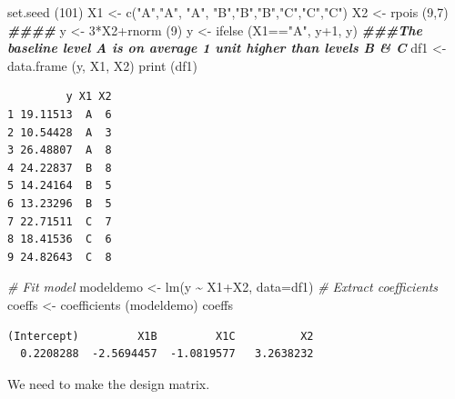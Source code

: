 \documentclass[
  oneside]{krantz}
\newenvironment{Shaded}{\begin{snugshade}}{\end{snugshade}}
\newcommand{\AttributeTok}[1]{\textcolor[rgb]{0.77,0.63,0.00}{#1}}
\newcommand{\CommentTok}[1]{\textcolor[rgb]{0.56,0.35,0.01}{\textit{#1}}}
\newcommand{\DecValTok}[1]{\textcolor[rgb]{0.00,0.00,0.81}{#1}}
\newcommand{\DocumentationTok}[1]{\textcolor[rgb]{0.56,0.35,0.01}{\textbf{\textit{#1}}}}
\newcommand{\FunctionTok}[1]{\textcolor[rgb]{0.00,0.00,0.00}{#1}}
\newcommand{\NormalTok}[1]{#1}
\newcommand{\OtherTok}[1]{\textcolor[rgb]{0.56,0.35,0.01}{#1}}
\newcommand{\SpecialCharTok}[1]{\textcolor[rgb]{0.00,0.00,0.00}{#1}}
\newcommand{\StringTok}[1]{\textcolor[rgb]{0.31,0.60,0.02}{#1}}
\begin{document}
\begin{Shaded}
\begin{Highlighting}[]
\FunctionTok{set.seed}\NormalTok{ (}\DecValTok{101}\NormalTok{)}
\NormalTok{X1 }\OtherTok{\textless{}{-}} \FunctionTok{c}\NormalTok{(}\StringTok{"A"}\NormalTok{,}\StringTok{"A"}\NormalTok{, }\StringTok{"A"}\NormalTok{, }\StringTok{"B"}\NormalTok{,}\StringTok{"B"}\NormalTok{,}\StringTok{"B"}\NormalTok{,}\StringTok{"C"}\NormalTok{,}\StringTok{"C"}\NormalTok{,}\StringTok{"C"}\NormalTok{)}
\NormalTok{X2  }\OtherTok{\textless{}{-}} \FunctionTok{rpois}\NormalTok{ (}\DecValTok{9}\NormalTok{,}\DecValTok{7}\NormalTok{) }\DocumentationTok{\#\#\#\#}
\NormalTok{y }\OtherTok{\textless{}{-}} \DecValTok{3}\SpecialCharTok{*}\NormalTok{X2}\SpecialCharTok{+}\FunctionTok{rnorm}\NormalTok{ (}\DecValTok{9}\NormalTok{)}
\NormalTok{y }\OtherTok{\textless{}{-}} \FunctionTok{ifelse}\NormalTok{ (X1}\SpecialCharTok{==}\StringTok{"A"}\NormalTok{, y}\SpecialCharTok{+}\DecValTok{1}\NormalTok{, y) }\DocumentationTok{\#\#\#The baseline level A is on average 1 unit higher than levels B \& C}
\NormalTok{df1 }\OtherTok{\textless{}{-}} \FunctionTok{data.frame}\NormalTok{ (y, X1, X2)}
\FunctionTok{print}\NormalTok{ (df1)}
\end{Highlighting}
\end{Shaded}

\begin{verbatim}
         y X1 X2
1 19.11513  A  6
2 10.54428  A  3
3 26.48807  A  8
4 24.22837  B  8
5 14.24164  B  5
6 13.23296  B  5
7 22.71511  C  7
8 18.41536  C  6
9 24.82643  C  8
\end{verbatim}

\begin{Shaded}
\begin{Highlighting}[]
\CommentTok{\# Fit model }
\NormalTok{modeldemo }\OtherTok{\textless{}{-}} \FunctionTok{lm}\NormalTok{(y }\SpecialCharTok{\textasciitilde{}}\NormalTok{ X1}\SpecialCharTok{+}\NormalTok{X2, }\AttributeTok{data=}\NormalTok{df1)}
\CommentTok{\# Extract coefficients}
\NormalTok{coeffs }\OtherTok{\textless{}{-}} \FunctionTok{coefficients}\NormalTok{ (modeldemo)}
\NormalTok{coeffs}
\end{Highlighting}
\end{Shaded}

\begin{verbatim}
(Intercept)         X1B         X1C          X2 
  0.2208288  -2.5694457  -1.0819577   3.2638232 
\end{verbatim}

We need to make the design matrix.
\end{document}
